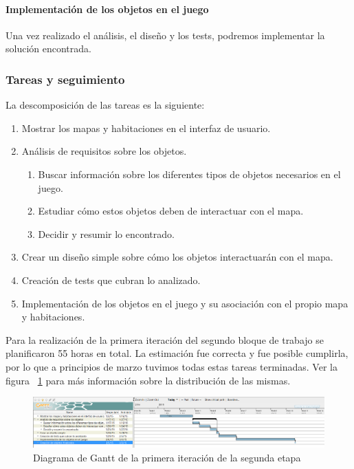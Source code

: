 \paragraph{Implementación de los objetos en el juego} Una vez realizado el análisis, el diseño y los tests, podremos implementar la solución encontrada.

\subsubsection{Tareas y seguimiento}

La descomposición de las tareas es la siguiente:

\begin{enumerate}[label=\bfseries WBS 1.\arabic*]
  \item Mostrar los mapas y habitaciones en el interfaz de usuario.
  \item Análisis de requisitos sobre los objetos.
    \begin{enumerate}[label=\bfseries WBS 1.1.\arabic*]
      \item Buscar información sobre los diferentes tipos de objetos necesarios en el juego.
      \item Estudiar cómo estos objetos deben de interactuar con el mapa.
      \item Decidir y resumir lo encontrado.
    \end{enumerate}
  \item Crear un diseño simple sobre cómo los objetos interactuarán con el mapa.
  \item Creación de tests que cubran lo analizado.
  \item Implementación de los objetos en el juego y su asociación con el propio mapa y habitaciones.
\end{enumerate}

Para la realización de la primera iteración del segundo bloque de trabajo se planificaron 55 horas en total. La estimación fue correcta y fue posible cumplirla, por lo que a principios de marzo tuvimos todas estas tareas terminadas. Ver la figura ~\ref{fig:sec2it1} para más información sobre la distribución de las mismas.

\begin{figure}
    \includegraphics[width=\textwidth,height=\textheight,keepaspectratio]{./img/sec2it1.png}
  \caption{Diagrama de Gantt de la primera iteración de la segunda etapa}
  \label{fig:sec2it1}
\end{figure}

